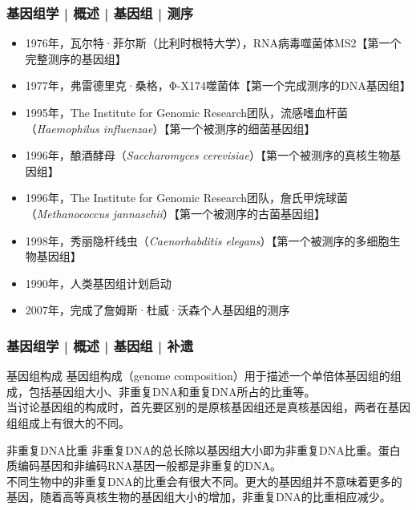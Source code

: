\begin{frame}
  \frametitle{基因组学 | 概述 | 基因组 | 测序}
  \begin{itemize}[<+->]
    \item 1976年，瓦尔特·菲尔斯（比利时根特大学），RNA病毒噬菌体MS2【第一个完整测序的基因组】
    \item 1977年，弗雷德里克·桑格，Φ-X174噬菌体【第一个完成测序的DNA基因组】
    \item 1995年，The Institute for Genomic Research团队，流感嗜血杆菌（\textit{Haemophilus influenzae}）【第一个被测序的细菌基因组】
    \item 1996年，酿酒酵母（\textit{Saccharomyces cerevisiae}）【第一个被测序的真核生物基因组】
    \item 1996年，The Institute for Genomic Research团队，詹氏甲烷球菌（\textit{Methanococcus jannaschii}）【第一个被测序的古菌基因组】
    \item 1998年，秀丽隐杆线虫（\textit{Caenorhabditis elegans}）【第一个被测序的多细胞生物基因组】
    \item 1990年，人类基因组计划启动
    \item 2007年，完成了詹姆斯·杜威·沃森个人基因组的测序
  \end{itemize}
\end{frame}

\begin{frame}
  \frametitle{基因组学 | 概述 | 基因组 | 补遗}
  \begin{block}{基因组构成}
基因组构成（genome composition）用于描述一个单倍体基因组的组成，包括基因组大小、非重复DNA和重复DNA所占的比重等。\\
\vspace{1em}
当讨论基因组的构成时，首先要区别的是原核基因组还是真核基因组，两者在基因组组成上有很大的不同。
  \end{block}
  \pause
  \begin{block}{非重复DNA比重}
非重复DNA的总长除以基因组大小即为非重复DNA比重。蛋白质编码基因和非编码RNA基因一般都是非重复的DNA。\\
\vspace{1em}
不同生物中的非重复DNA的比重会有很大不同。更大的基因组并不意味着更多的基因，随着高等真核生物的基因组大小的增加，非重复DNA的比重相应减少。
  \end{block}
\end{frame}

